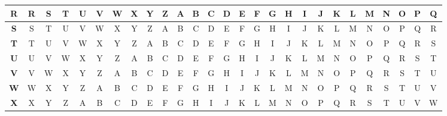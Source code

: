 \begin{table}[H]
{\begin{tabular}{c|c|c|c|c|c|c|c|c|c|c|c|c|c|c|c|c|c|c|c|c|c|c|c|c|c|c|}
            \hline
            \textbf{R} & R          & S          & T          & U          & V          & W          & X          & Y          & Z          & A          & B          & C          & D          & E          & F          & G          & H          & I          & J          & K          & L          & M          & N          & O          & P          & Q          \\[-1ex]
            \hline
            \textbf{S} & S          & T          & U          & V          & W          & X          & Y          & Z          & A          & B          & C          & D          & E          & F          & G          & H          & I          & J          & K          & L          & M          & N          & O          & P          & Q          & R          \\[-1ex]
            \hline
            \textbf{T} & T          & U          & V          & W          & X          & Y          & Z          & A          & B          & C          & D          & E          & F          & G          & H          & I          & J          & K          & L          & M          & N          & O          & P          & Q          & R          & S          \\[-1ex]
            \hline
            \textbf{U} & U          & V          & W          & X          & Y          & Z          & A          & B          & C          & D          & E          & F          & G          & H          & I          & J          & K          & L          & M          & N          & O          & P          & Q          & R          & S          & T          \\[-1ex]
            \hline
            \textbf{V} & V          & W          & X          & Y          & Z          & A          & B          & C          & D          & E          & F          & G          & H          & I          & J          & K          & L          & M          & N          & O          & P          & Q          & R          & S          & T          & U          \\[-1ex]
            \hline
            \textbf{W} & W          & X          & Y          & Z          & A          & B          & C          & D          & E          & F          & G          & H          & I          & J          & K          & L          & M          & N          & O          & P          & Q          & R          & S          & T          & U          & V          \\[-1ex]
            \hline
            \textbf{X} & X          & Y          & Z          & A          & B          & C          & D          & E          & F          & G          & H          & I          & J          & K          & L          & M          & N          & O          & P          & Q          & R          & S          & T          & U          & V          & W          \\[-1ex]

\end{tabular}}
\end{table}
